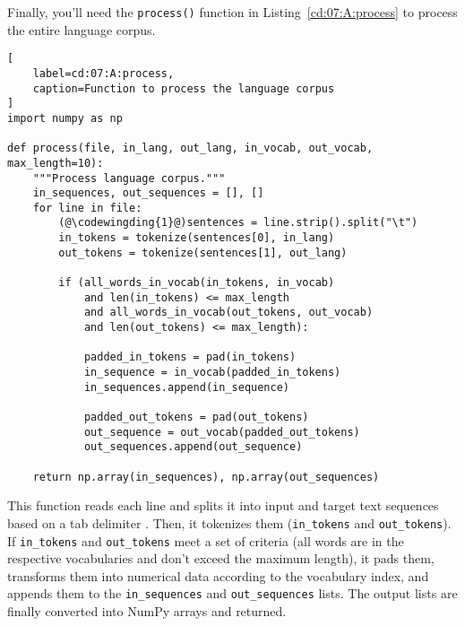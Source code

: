 Finally, you'll need the \lstinline{process()} function in Listing~\ref{cd:07:A:process} to process the entire language corpus.
\begin{lstlisting}[
    label=cd:07:A:process,
    caption=Function to process the language corpus
]
import numpy as np

def process(file, in_lang, out_lang, in_vocab, out_vocab, max_length=10):
    """Process language corpus."""
    in_sequences, out_sequences = [], []
    for line in file:
        (@\codewingding{1}@)sentences = line.strip().split("\t")
        in_tokens = tokenize(sentences[0], in_lang)
        out_tokens = tokenize(sentences[1], out_lang)

        if (all_words_in_vocab(in_tokens, in_vocab)
            and len(in_tokens) <= max_length
            and all_words_in_vocab(out_tokens, out_vocab)
            and len(out_tokens) <= max_length):
            
            padded_in_tokens = pad(in_tokens)
            in_sequence = in_vocab(padded_in_tokens)
            in_sequences.append(in_sequence)
            
            padded_out_tokens = pad(out_tokens)
            out_sequence = out_vocab(padded_out_tokens)
            out_sequences.append(out_sequence)

    return np.array(in_sequences), np.array(out_sequences)
\end{lstlisting}
This function reads each line and splits it into input and target text sequences based on a tab delimiter . Then, it tokenizes them (\lstinline{in_tokens} and \lstinline{out_tokens}). 
If \lstinline{in_tokens} and \lstinline{out_tokens} meet a set of criteria (all words are in the respective vocabularies and don't exceed the maximum length), it pads them, transforms them into numerical data according to the vocabulary index, and appends them to the \lstinline{in_sequences} and \lstinline{out_sequences} lists. The output lists are finally converted into NumPy arrays and returned.

